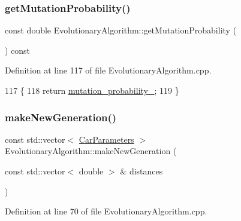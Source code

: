 \subsubsection{\texorpdfstring{get\+Mutation\+Probability()}{getMutationProbability()}}
{\footnotesize\ttfamily const double Evolutionary\+Algorithm\+::get\+Mutation\+Probability (\begin{DoxyParamCaption}{ }\end{DoxyParamCaption}) const}



Definition at line 117 of file Evolutionary\+Algorithm.\+cpp.


\begin{DoxyCode}
117                                                                  \{
118     \textcolor{keywordflow}{return} \hyperlink{classEvolutionaryAlgorithm_ab847e49664c7b97e1e55963e6f33b332}{mutation\_probability\_};
119 \}
\end{DoxyCode}
\mbox{\label{classEvolutionaryAlgorithm_aa4dc48e8ad0d0e5892546ce6978f492f}} 
\subsubsection{\texorpdfstring{make\+New\+Generation()}{makeNewGeneration()}}
{\footnotesize\ttfamily const std\+::vector$<$ \hyperlink{classCarParameters}{Car\+Parameters} $>$ Evolutionary\+Algorithm\+::make\+New\+Generation (\begin{DoxyParamCaption}\item[{const std\+::vector$<$ double $>$ \&}]{distances }\end{DoxyParamCaption})}



Definition at line 70 of file Evolutionary\+Algorithm.\+cpp.


